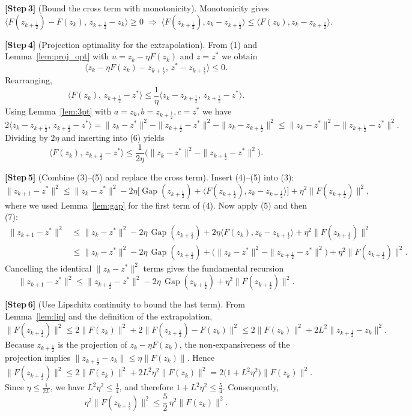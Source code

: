 \documentclass{article}
\newcommand{\gap}{\operatorname{Gap}}
\begin{document}
\bigskip
\noindent\textbf{[Step 3]} (Bound the cross term with monotonicity).  
Monotonicity gives
\[
\langle F(z_{k+\frac12})-F(z_{k}),\,z_{k+\frac12}-z_{k}\rangle\ge0
\;\Longrightarrow\;
\langle F(z_{k+\frac12}),z_{k}-z_{k+\frac12}\rangle
\le\langle F(z_{k}),z_{k}-z_{k+\frac12}\rangle .
\tag{5}
\]

\bigskip
\noindent\textbf{[Step 4]} (Projection optimality for the extrapolation).  
From (1) and Lemma~\ref{lem:proj_opt} with $u=z_{k}-\eta F(z_{k})$ and $z=z^{*}$ we obtain
\[
\langle z_{k}-\eta F(z_{k})-z_{k+\frac12},\,z^{*}-z_{k+\frac12}\rangle\le0 .
\]
Rearranging,
\[
\langle F(z_{k}),\,z_{k+\frac12}-z^{*}\rangle
\le\frac{1}{\eta}\langle z_{k}-z_{k+\frac12},\,z_{k+\frac12}-z^{*}\rangle .
\tag{6}
\]
Using Lemma~\ref{lem:3pt} with $a=z_{k},b=z_{k+\frac12},c=z^{*}$ we have
\[
2\langle z_{k}-z_{k+\frac12},\,z_{k+\frac12}-z^{*}\rangle
= \|z_{k}-z^{*}\|^{2}-\|z_{k+\frac12}-z^{*}\|^{2}-\|z_{k}-z_{k+\frac12}\|^{2}
\le \|z_{k}-z^{*}\|^{2}-\|z_{k+\frac12}-z^{*}\|^{2}.
\]
Dividing by $2\eta$ and inserting into (6) yields
\[
\langle F(z_{k}),\,z_{k+\frac12}-z^{*}\rangle
\le\frac{1}{2\eta}\bigl(\|z_{k}-z^{*}\|^{2}-\|z_{k+\frac12}-z^{*}\|^{2}\bigr).
\tag{7}
\]

\bigskip
\noindent\textbf{[Step 5]} (Combine (3)–(5) and replace the cross term).  
Insert (4)–(5) into (3):
\[
\|z_{k+1}-z^{*}\|^{2}
\le\|z_{k}-z^{*}\|^{2}
-2\eta\bigl[\gap(z_{k+\frac12})+\langle F(z_{k+\frac12}),z_{k}-z_{k+\frac12}\rangle\bigr]
+\eta^{2}\|F(z_{k+\frac12})\|^{2},
\]
where we used Lemma~\ref{lem:gap} for the first term of (4).  
Now apply (5) and then (7):
\[
\begin{aligned}
\|z_{k+1}-z^{*}\|^{2}
&\le\|z_{k}-z^{*}\|^{2}
-2\eta\,\gap(z_{k+\frac12})
+2\eta\langle F(z_{k}),z_{k}-z_{k+\frac12}\rangle
+\eta^{2}\|F(z_{k+\frac12})\|^{2}\\[1mm]
&\le\|z_{k}-z^{*}\|^{2}
-2\eta\,\gap(z_{k+\frac12})
+ \bigl(\|z_{k}-z^{*}\|^{2}-\|z_{k+\frac12}-z^{*}\|^{2}\bigr)
+\eta^{2}\|F(z_{k+\frac12})\|^{2}.
\end{aligned}
\]
Cancelling the identical $\|z_{k}-z^{*}\|^{2}$ terms gives the fundamental recursion
\begin{equation}
\|z_{k+1}-z^{*}\|^{2}
\le\|z_{k+\frac12}-z^{*}\|^{2}
-2\eta\,\gap(z_{k+\frac12})
+\eta^{2}\|F(z_{k+\frac12})\|^{2}.
\tag{8}
\end{equation}

\bigskip
\noindent\textbf{[Step 6]} (Use Lipschitz continuity to bound the last term).  
From Lemma~\ref{lem:lip} and the definition of the extrapolation,
\[
\|F(z_{k+\frac12})\|^{2}
\le 2\|F(z_{k})\|^{2}+2\|F(z_{k+\frac12})-F(z_{k})\|^{2}
\le 2\|F(z_{k})\|^{2}+2L^{2}\|z_{k+\frac12}-z_{k}\|^{2}.
\]
Because $z_{k+\frac12}$ is the projection of $z_{k}-\eta F(z_{k})$, the non‑expansiveness of the projection implies
$\|z_{k+\frac12}-z_{k}\|\le\eta\|F(z_{k})\|$.  Hence
\[
\|F(z_{k+\frac12})\|^{2}\le 2\|F(z_{k})\|^{2}+2L^{2}\eta^{2}\|F(z_{k})\|^{2}
=2\bigl(1+L^{2}\eta^{2}\bigr)\|F(z_{k})\|^{2}.
\tag{9}
\]
Since $\eta\le\frac{1}{2L}$, we have $L^{2}\eta^{2}\le\frac14$, and therefore $1+L^{2}\eta^{2}\le\frac54$.
Consequently,
\[
\eta^{2}\|F(z_{k+\frac12})\|^{2}\le\frac{5}{2}\,\eta^{2}\|F(z_{k})\|^{2}.
\tag{10}
\]
\end{document}
